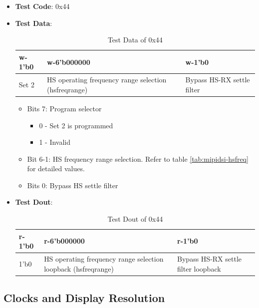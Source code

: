 \documentclass[main\_\_EN.tex]{subfiles}
\begin{document}
\begin{itemize}
    \item \textbf{Test Code}: 0x44
    \item \textbf{Test Data}: 
        \begin{longtable}{ |p{2cm}|p{6cm}|p{6cm}|}
            \caption{Test Data of 0x44}
            \label{tab:test-data-0x44} \\
            \hline
            \rowcolor{lightgray}
            \textbf{w-1'b0} & \textbf{w-6'b000000} & \textbf{w-1'b0} \\ \hline
            Set 2 & HS operating frequency range selection (hsfreqrange) & Bypass HS-RX settle filter \\ \hline
        \end{longtable}

        \begin{itemize}
            \item Bits 7: Program selector
                \begin{itemize}
                    \item 0 - Set 2 is programmed
                    \item 1 - Invalid
                \end{itemize}
            \item Bit 6-1: HS frequency range selection. Refer to table \ref{tab:mipidsi-hsfreq} for detailed values.
            \item Bits 0: Bypass HS settle filter
        \end{itemize}
    \item \textbf{Test Dout}:
        \begin{longtable}{ |p{2cm}|p{6cm}|p{6cm}|}
            \caption{Test Dout of 0x44}
            \label{tab:test-dout-0x44} \\
            \hline
            \rowcolor{lightgray}
            \textbf{r-1'b0} & \textbf{r-6'b000000} & \textbf{r-1'b0} \\ \hline
            1'b0 & HS operating frequency range selection loopback (hsfreqrange) & Bypass HS-RX settle filter loopback \\ \hline
        \end{longtable}
\end{itemize}


\subsection{Clocks and Display Resolution}
\label{sec:clocks-and-display-resolution}
\end{document}
